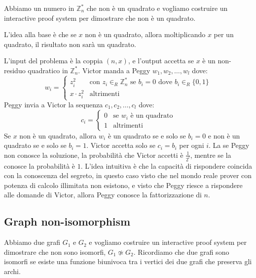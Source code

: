Abbiamo un numero in $\mathbb{Z}_n^*$ che non è un quadrato e vogliamo costruire un interactive proof system
per dimostrare che non è un quadrato.

L'idea alla base è che se $x$ non è un quadrato, allora moltiplicando $x$ per un quadrato, il risultato non sarà un quadrato.

L'input del problema è la coppia $(n,x)$, e l'output accetta se $x$ è un non-residuo quadratico in $\mathbb{Z}_n^*$.
Victor manda a Peggy $w_1, w_2, \dots, w_l$ dove:
\[
  w_i = \begin{cases}
    z_i^2 & \text{con } z_i \in_R \mathbb{Z}_n^* \text{ se }b_i = 0 \text{ dove }b_i \in_R \{0,1\} \\
    x \cdot z_i^2 & \text{altrimenti}  
    \end{cases}
\]
Peggy invia a Victor la sequenza $c_1, c_2, \dots, c_l$ dove:
\[
  c_i = \begin{cases}
    0 & \text{se }w_i \text{ è un quadrato} \\
    1 & \text{altrimenti}
    \end{cases}
\]
Se $x$ non è un quadrato, allora $w_i$ è un quadrato se e solo se $b_i = 0$ e
non è un quadrato se e solo se $b_i = 1$. Victor accetta solo se $c_i = b_i$ per ogni $i$.
La se Peggy non conosce la soluzione, la probabilità che Victor accetti è $\frac{1}{2^l}$, 
mentre se la conosce la probabilità è $1$.
L'idea intuitiva è che la capacità di rispondere coincida con la conoscenza del segreto, in questo caso 
visto che nel mondo reale prover con potenza di calcolo illimitata non esistono, e visto 
che Peggy riesce a rispondere alle domande di Victor, allora Peggy conosce la fattorizzazione 
di $n$.
\subsection{Graph non-isomorphism}
Abbiamo due grafi $G_1$ e $G_2$ e vogliamo costruire un interactive proof system per dimostrare che non sono isomorfi,
$G_1 \not\simeq  G_2$. Ricordiamo che due grafi sono isomorfi se esiste una funzione biunivoca tra i vertici dei due
grafi che preserva gli archi.

